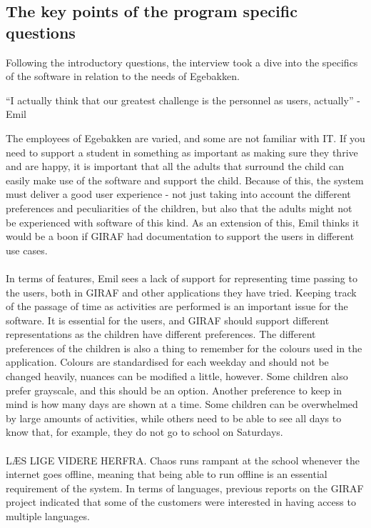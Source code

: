 \subsection{The key points of the program specific questions}
Following the introductory questions, the interview took a dive into the specifics of the software in relation to the needs of Egebakken.
\begin{displayquote}
    ``I actually think that our greatest challenge is the personnel as users, actually''  - Emil
\end{displayquote}
The employees of Egebakken are varied, and some are not familiar with IT.
If you need to support a student in something as important as making sure they thrive and are happy, it is important that all the adults that surround the child can easily make use of the software and support the child.
Because of this, the system must deliver a good user experience - not just taking into account the different preferences and peculiarities of the children, but also that the adults might not be experienced with software of this kind.
As an extension of this, Emil thinks it would be a boon if GIRAF had documentation to support the users in different use cases.
\\\\
In terms of features, Emil sees a lack of support for representing time passing to the users, both in GIRAF and other applications they have tried.
Keeping track of the passage of time as activities are performed is an important issue for the software.
It is essential for the users, and GIRAF should support different representations as the children have different preferences.
The different preferences of the children is also a thing to remember for the colours used in the application.
Colours are standardised for each weekday and should not be changed heavily, nuances can be modified a little, however.
Some children also prefer grayscale, and this should be an option.
Another preference to keep in mind is how many days are shown at a time.
Some children can be overwhelmed by large amounts of activities, while others need to be able to see all days to know that, for example, they do not go to school on Saturdays.
\\\\
LÆS LIGE VIDERE HERFRA.
Chaos runs rampant at the school whenever the internet goes offline, meaning that being able to run offline is an essential requirement of the system. 
In terms of languages, previous reports on the GIRAF project indicated that some of the customers were interested in having access to multiple languages.
